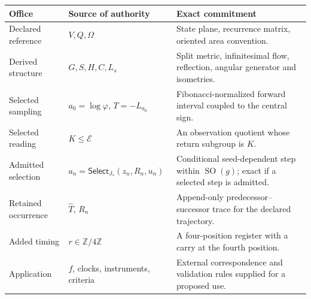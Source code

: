 \documentclass[10pt,letterpaper]{article}
\theoremstyle{definition}\newtheorem{definition}[theorem]{Definition}
\newcommand{\ZZ}{\mathbb Z}
\newcommand{\SO}{\operatorname{SO}}
\newcommand{\ph}{\varphi}
\begin{document}
\begin{center}
\small
\begin{tabularx}{\linewidth}{@{}p{1.12in}p{1.48in}X@{}}
\toprule
\textbf{Office}&\textbf{Source of authority}&\textbf{Exact commitment}\\\midrule
Declared reference & $V,Q,\Omega$ & State plane, recurrence matrix, oriented area convention.\\
Derived structure & $G,S,H,C,L_s$ & Split metric, infinitesimal flow, reflection, angular generator and isometries.\\
Selected sampling & $a_0=\log\ph$, $T=-L_{a_0}$ & Fibonacci-normalized forward interval coupled to the central sign.\\
Selected reading & $K\leq\mathcal E$ & An observation quotient whose return subgroup is $K$.\\
Admitted selection & $a_n=\mathsf{Select}_{J_*}(z_n,R_n,u_n)$ & Conditional seed-dependent step within $\SO(g)$; exact if a selected step is admitted.\\
Retained occurrence & $\widehat T$, $R_n$ & Append-only predecessor--successor trace for the declared trajectory.\\
Added timing & $r\in\ZZ/4\ZZ$ & A four-position register with a carry at the fourth position.\\
Application & $f$, clocks, instruments, criteria & External correspondence and validation rules supplied for a proposed use.\\
\bottomrule
\end{tabularx}
\end{center}
\end{document}

